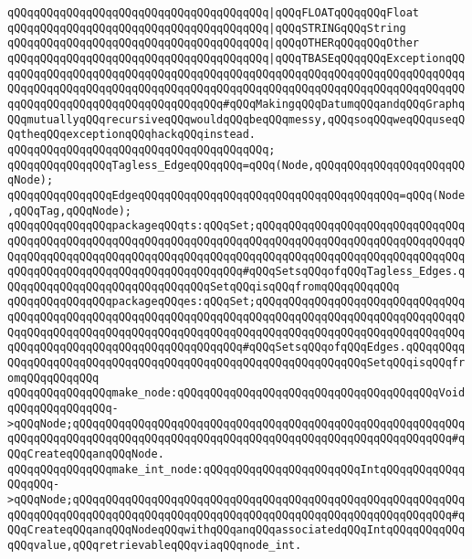 \verb|qQQqqQQqqQQqqQQqqQQqqQQqqQQqqQQqqQQqqQQq|\verb#|qQQqFLOATqQQqqQQqFloat#\newline
\verb|qQQqqQQqqQQqqQQqqQQqqQQqqQQqqQQqqQQqqQQq|\verb#|qQQqSTRINGqQQqString#\newline
\verb|qQQqqQQqqQQqqQQqqQQqqQQqqQQqqQQqqQQqqQQq|\verb#|qQQqOTHERqQQqqQQqOther#\newline
\verb|qQQqqQQqqQQqqQQqqQQqqQQqqQQqqQQqqQQqqQQq|\verb#|qQQqTBASEqQQqqQQqExceptionqQQqqQQqqQQqqQQqqQQqqQQqqQQqqQQqqQQqqQQqqQQqqQQqqQQqqQQqqQQqqQQqqQQqqQQqqQQqqQQqqQQqqQQqqQQqqQQqqQQqqQQqqQQqqQQqqQQqqQQqqQQqqQQqqQQqqQQqqQQqqQQqqQQqqQQqqQQqqQQqqQQqqQQqqQQqqQQq#\verb|#qQQqMakingqQQqDatumqQQqandqQQqGraphqQQqmutuallyqQQqrecursiveqQQqwouldqQQqbeqQQqmessy,qQQqsoqQQqweqQQquseqQQqtheqQQqexceptionqQQqhackqQQqinstead.|\newline
\verb|qQQqqQQqqQQqqQQqqQQqqQQqqQQqqQQqqQQqqQQq;|\newline
\newline
\verb|qQQqqQQqqQQqqQQqTagless_EdgeqQQqqQQq=qQQq(Node,qQQqqQQqqQQqqQQqqQQqqQQqNode);|\newline
\verb|qQQqqQQqqQQqqQQqEdgeqQQqqQQqqQQqqQQqqQQqqQQqqQQqqQQqqQQqqQQq=qQQq(Node,qQQqTag,qQQqNode);|\newline
\newline
\verb|qQQqqQQqqQQqqQQqpackageqQQqts:qQQqSet;qQQqqQQqqQQqqQQqqQQqqQQqqQQqqQQqqQQqqQQqqQQqqQQqqQQqqQQqqQQqqQQqqQQqqQQqqQQqqQQqqQQqqQQqqQQqqQQqqQQqqQQqqQQqqQQqqQQqqQQqqQQqqQQqqQQqqQQqqQQqqQQqqQQqqQQqqQQqqQQqqQQqqQQqqQQqqQQqqQQqqQQqqQQqqQQqqQQqqQQqqQQqqQQq#qQQqSetsqQQqofqQQqTagless_Edges.qQQqqQQqqQQqqQQqqQQqqQQqqQQqqQQqSetqQQqisqQQqfromqQQqqQQqqQQq|\newline
\verb|qQQqqQQqqQQqqQQqpackageqQQqes:qQQqSet;qQQqqQQqqQQqqQQqqQQqqQQqqQQqqQQqqQQqqQQqqQQqqQQqqQQqqQQqqQQqqQQqqQQqqQQqqQQqqQQqqQQqqQQqqQQqqQQqqQQqqQQqqQQqqQQqqQQqqQQqqQQqqQQqqQQqqQQqqQQqqQQqqQQqqQQqqQQqqQQqqQQqqQQqqQQqqQQqqQQqqQQqqQQqqQQqqQQqqQQqqQQqqQQq#qQQqSetsqQQqofqQQqEdges.qQQqqQQqqQQqqQQqqQQqqQQqqQQqqQQqqQQqqQQqqQQqqQQqqQQqqQQqqQQqqQQqSetqQQqisqQQqfromqQQqqQQqqQQq|\newline
\newline
\verb|qQQqqQQqqQQqqQQqmake_node:qQQqqQQqqQQqqQQqqQQqqQQqqQQqqQQqqQQqqQQqVoidqQQqqQQqqQQqqQQq->qQQqNode;qQQqqQQqqQQqqQQqqQQqqQQqqQQqqQQqqQQqqQQqqQQqqQQqqQQqqQQqqQQqqQQqqQQqqQQqqQQqqQQqqQQqqQQqqQQqqQQqqQQqqQQqqQQqqQQqqQQqqQQqqQQqqQQq#qQQqCreateqQQqanqQQqNode.|\newline
\verb|qQQqqQQqqQQqqQQqmake_int_node:qQQqqQQqqQQqqQQqqQQqqQQqIntqQQqqQQqqQQqqQQqqQQq->qQQqNode;qQQqqQQqqQQqqQQqqQQqqQQqqQQqqQQqqQQqqQQqqQQqqQQqqQQqqQQqqQQqqQQqqQQqqQQqqQQqqQQqqQQqqQQqqQQqqQQqqQQqqQQqqQQqqQQqqQQqqQQqqQQqqQQq#qQQqCreateqQQqanqQQqNodeqQQqwithqQQqanqQQqassociatedqQQqIntqQQqqQQqqQQqqQQqvalue,qQQqretrievableqQQqviaqQQqnode_int.|\newline
